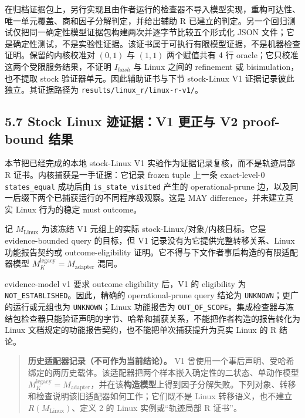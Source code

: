 \documentclass[
  11pt,
  a4paper,
]{ctexart}
\begin{document}
在归档证据包上，另行实现且由作者运行的检查器不导入模型实现，重构可达性、唯一单元覆盖、商和因子分解判定，并给出辅助
R
已建立的判定。另一个回归测试仅把同一确定性模型证据包构建两次并逐字节比较五个形式化
JSON
文件；它是确定性测试，不是实验性证据。该证书属于可执行有限模型证据，不是机器检查证明。保留的内核校准对
\((0,1)\) 与 \((1,1)\) 两个赋值共有 4 行
oracle；它只校准这两个受限服务结果，不证明 \(I_{\mathit{hash}}\) 与
Linux 之间的 refinement 或 bisimulation，也不提取 stock
验证器单元。因此辅助证书与下节 stock-Linux V1
证据记录彼此独立。其证据路径为 \texttt{results/linux\_r/linux-r-v1/}。

\hypertarget{57-stock-linux-ux8ff9ux8bc1ux636ev1-ux66f4ux6b63ux4e0e-v2-proof-bound-ux7ed3ux679c}{%
\subsection{5.7 Stock Linux 迹证据：V1 更正与 V2 proof-bound
结果}\label{57-stock-linux-ux8ff9ux8bc1ux636ev1-ux66f4ux6b63ux4e0e-v2-proof-bound-ux7ed3ux679c}}

本节把已经完成的本地 stock-Linux V1 实验作为证据记录复核，而不是轨迹局部
R 证书。内核捕获是一手证据：它记录 frozen tuple 上一条 exact-level-0
\texttt{states\_equal} 成功后由 \texttt{is\_state\_visited} 产生的
operational-prune 边，以及同一后缀下两个已捕获运行的不同程序级观察。这是
MAY difference，并未建立真实 Linux 行为的稳定 must outcome。

记 \(M_{\mathrm{Linux}}\) 为该冻结 V1 元组上的实际
stock-Linux/对象/内核目标。它是 evidence-bounded query 的目标，但 V1
记录没有为它提供完整转移关系、Linux 功能报告契约或 outcome-eligibility
证明。它不得与下文作者事后构造的有限适配器模型
\(M_K^{\mathrm{legacy}}=M_{\mathrm{adapter}}\) 混同。

evidence-model v1 要求 outcome eligibility 后，V1 的 eligibility 为
\texttt{NOT\_ESTABLISHED}。因此，精确的 operational-prune query 结论为
\texttt{UNKNOWN}；更广的运行或元组也为 \texttt{UNKNOWN}；Linux
功能报告为
\texttt{OUT\_OF\_SCOPE}。集成检查器与冻结包检查器只能验证声明的字节、哈希和捕获关系，不能把作者构造的报告转化为
Linux 文档规定的功能报告契约，也不能把单次捕获提升为真实 Linux 的 R
结论。

\begin{quote}
\textbf{历史适配器记录（不可作为当前结论）。} V1
曾使用一个事后声明、受哈希绑定的两历史载体。该适配器把两个样本嵌入确定性的二状态、单动作模型
\(M_K^{\mathrm{legacy}}=M_{\mathrm{adapter}}\)，并在该\textbf{构造模型}上得到因子分解失败。下列对象、转移和检查说明该旧适配器如何工作；它们既不是
Linux 转移语义，也不建立 \(R(M_{\mathrm{Linux}})\)、定义 2 的 Linux
实例或``轨迹局部 R 证书''。
\end{quote}
\end{document}
